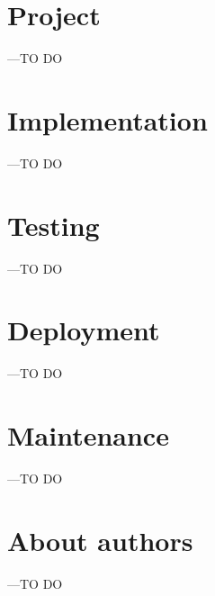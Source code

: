 \documentclass[a4paper]{article}
\begin{document}
\section{Project}
---TO DO

\section{Implementation}
---TO DO
\section{Testing}
---TO DO
\section{Deployment}
---TO DO

\section{Maintenance}
---TO DO

\section{About authors}
---TO DO


\end{document}

